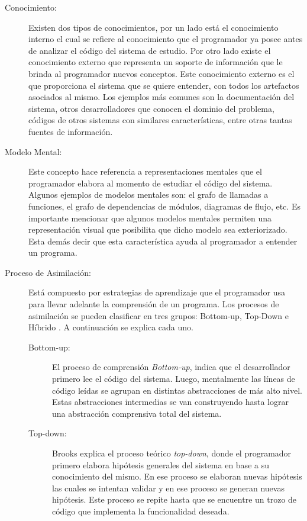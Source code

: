 \begin{description}

\item[Conocimiento:] Existen dos tipos de conocimientos, por un lado está el conocimiento interno el cual se refiere al conocimiento que el programador ya posee antes de analizar el código del sistema de estudio. Por otro lado existe el conocimiento externo que representa un soporte de información que le brinda al programador nuevos conceptos. Este conocimiento externo es el que proporciona el sistema que se quiere entender, con todos los artefactos asociados al mismo.
Los ejemplos más comunes son la documentación del sistema, otros desarrolladores que conocen el dominio del problema, códigos de otros sistemas con similares características, entre otras tantas fuentes de información.

\item[Modelo Mental:] Este concepto hace referencia a representaciones mentales que el programador elabora al momento de estudiar el código del sistema. 
Algunos ejemplos de modelos mentales son: el grafo de llamadas a funciones, el grafo de dependencias de módulos, diagramas de flujo, etc. Es importante mencionar que algunos modelos mentales permiten una representación visual que posibilita que dicho modelo sea exteriorizado. Esta demás decir que esta característica ayuda al programador a entender un programa.

\item[Proceso de Asimilación:] Está compuesto por estrategias de aprendizaje que el programador usa para llevar adelante la comprensión de un programa. Los procesos de asimilación se pueden clasificar en tres grupos: Bottom-up, Top-Down e Híbrido \cite{MPOB03,MAS05}. A continuación se explica cada uno.

\begin{description}

\item[Bottom-up:] El proceso de comprensión \textit{Bottom-up}, indica que el desarrollador primero lee el código del sistema. Luego, mentalmente las líneas de código leídas se agrupan en distintas abstracciones de más alto nivel. Estas abstracciones intermedias se van construyendo hasta lograr una abstracción comprensiva total del sistema.

\item[Top-down:] Brooks explica el proceso teórico \textit{top-down}, donde el programador primero elabora hipótesis generales del sistema en base a su conocimiento del mismo. En ese proceso se elaboran nuevas hipótesis las cuales se intentan validar y en ese proceso se generan nuevas hipótesis.
Este proceso se repite hasta que se encuentre un trozo de código que implementa la funcionalidad deseada.


\end{description}
\end{description}
